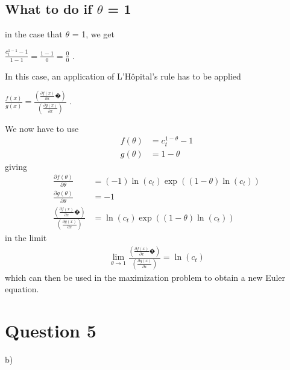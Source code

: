 \documentclass{article}
\begin{document}
\subsection{What to do if $\theta$ = 1}
in the case that $\theta$ = 1, we get \begin{center} $\frac{c_t^{1-1}-1}{1-1} = \frac{1-1}{0} = \frac{0}{0}$ .\end{center}
In this case, an application of L'H\^{o}pital's rule has to be applied
\begin{center} $\frac{f(x)}{g(x)} = \frac{\left (\frac{\partial f(x)}{\partial x}�\right )}{\left (\frac{ \partial g(x)}{\partial x}\right )}$ .\end{center}
We now have to use
\begin{align}
f(\theta ) &= c_t^{1- \theta} -1 \\
g( \theta) &=1 - \theta
\end{align}
giving
\begin{align}
\frac{ \partial f(\theta )}{\partial \theta} &= (-1) \ln (c_t) \exp({(1- \theta ) \ln (c_t)} )\\
\frac{ \partial g(\theta )}{\partial \theta} &= -1 \\
 \frac{\left (\frac{\partial f(x)}{\partial x}�\right )}{\left (\frac{ \partial g(x)}{ \partial x}\right )} &= \ln (c_t) \exp({(1- \theta ) \ln (c_t)} )
\end{align}
in the limit
\begin{align}
\lim_{\theta \rightarrow 1}  \frac{\left (\frac{\partial f(x)}{\partial x}�\right )}{\left (\frac{ \partial g(x)}{ \partial x}\right )}  = \ln(c_t) 
\end{align}
which can then be used in the maximization problem to obtain a new Euler equation.
\section{Question 5}
 b) \newline
\end{document}

